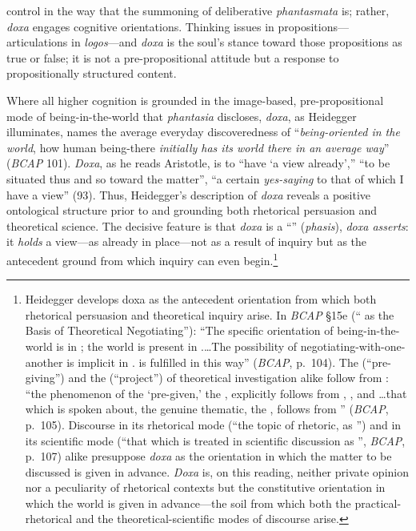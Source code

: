 control in the way that the summoning of deliberative \textit{phantasmata} is; rather, \textit{doxa} engages cognitive orientations. Thinking issues in propositions---articulations in \textit{logos}---and \textit{doxa} is the soul's stance toward those propositions as true or false; it is not a pre-propositional attitude but a response to propositionally structured content.

Where all higher cognition is grounded in the image-based, pre-propositional mode of being-in-the-world that \textit{phantasia} discloses, \textit{doxa}, as Heidegger illuminates, names the average everyday discoveredness of ``\textit{being-oriented in the world}, how human being-there \textit{initially has its world there in an average way}'' (\textit{BCAP} 101). \textit{Doxa}, as he reads Aristotle, is to ``have `a view already','' ``to be situated thus and so toward the matter'', ``a certain \textit{yes-saying} to that of which I have a view'' (93). Thus, Heidegger's description of \textit{doxa} reveals a positive ontological structure prior to and grounding both rhetorical persuasion and theoretical science. The decisive feature is that \textit{doxa} is a ``'' (\textit{phasis}), \textit{doxa asserts}: it \textit{holds} a view---as already in place---not as a result of inquiry but as the antecedent ground from which inquiry can even begin.\footnote{Heidegger develops doxa as the antecedent orientation from which both rhetorical persuasion and theoretical inquiry arise. In \textit{BCAP} §15e (`` as the Basis of Theoretical Negotiating''): ``The specific orientation of being-in-the-world is in ; the world is present in .\dots The possibility of negotiating-with-one-another is implicit in .  is fulfilled in this way'' (\textit{BCAP}, p.~104). The  (``pre-giving'') and the  (``project'') of theoretical investigation alike follow from : ``the phenomenon of the `pre-given,' the , explicitly follows from , , and \dots that which is spoken about, the genuine thematic, the , follows from '' (\textit{BCAP}, p.~105). Discourse in its rhetorical mode (``the topic of rhetoric, as '') and in its scientific mode (``that which is treated in scientific discussion as '', \textit{BCAP}, p.~107) alike presuppose \textit{doxa} as the orientation in which the matter to be discussed is given in advance. \textit{Doxa} is, on this reading, neither private opinion nor a peculiarity of rhetorical contexts but the constitutive orientation in which the world is given in advance---the soil from which both the practical-rhetorical and the theoretical-scientific modes of discourse arise.}

